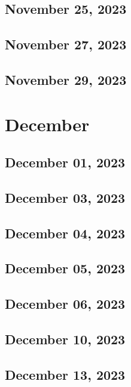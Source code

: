 \section{November 25, 2023}


\section{November 27, 2023}


\section{November 29, 2023}



\chapter{December}
\section{December 01, 2023}

\section{December 03, 2023}

\section{December 04, 2023}

\section{December 05, 2023}

\section{December 06, 2023}

\section{December 10, 2023}

\section{December 13, 2023}

% 
